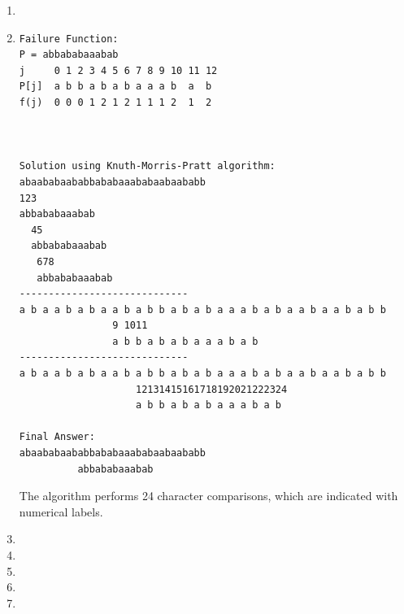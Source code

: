 \documentclass[11pt,fleqn]{article}
\begin{document}
\begin{enumerate}
	\item $~$\\

	\item 
\begin{Verbatim}
Failure Function:
P = abbababaaabab
j     0 1 2 3 4 5 6 7 8 9 10 11 12
P[j]  a b b a b a b a a a b  a  b
f(j)  0 0 0 1 2 1 2 1 1 1 2  1  2



Solution using Knuth-Morris-Pratt algorithm:
abaababaababbababaaababaabaababb
123
abbababaaabab
  45
  abbababaaabab
   678
   abbababaaabab
-----------------------------
a b a a b a b a a b a b b a b a b a a a b a b a a b a a b a b b
                9 1011
                a b b a b a b a a a b a b
-----------------------------
a b a a b a b a a b a b b a b a b a a a b a b a a b a a b a b b
                    12131415161718192021222324
                    a b b a b a b a a a b a b

Final Answer:
abaababaababbababaaababaabaababb
          abbababaaabab
\end{Verbatim}
The algorithm performs 24 character comparisons, which are
indicated with numerical labels.

	\item 

	\item 

	\item 

	\item 

	\item 

\end{enumerate}
\end{document}
